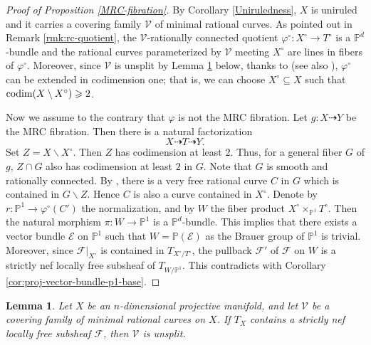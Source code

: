 \documentclass[english,reqno]{amsart}
\newcommand\cV{{\mathcal V}}
\newcommand\bbP{{\mathbb P}}
\newcommand\sE{{\mathscr E}}
\newcommand\sF{{\mathscr F}}
\newcommand{\codim}{{\rm codim}}
\theoremstyle{plain}
\newtheorem{lemma}[thm]{Lemma}
\theoremstyle{definition}
\numberwithin{equation}{section} %
\begin{document}
\begin{proof}[Proof of Proposition \ref{MRC-fibration}]
    By Corollary \ref{Uniruledness}, $X$ is uniruled and it carries a covering family $\cV$ of minimal rational curves. As pointed out in Remark \ref{rmk:rc-quotient}, the $\cV$-rationally connected quotient $\varphi^\circ\colon X^\circ\rightarrow T^\circ$ is a $\mathbb{P}^d$-bundle and the rational curves parameterized by $\cV$ meeting $X^\circ$ are lines in  fibers of $\varphi^\circ$. Moreover, since $\cV$ is unsplit by Lemma \ref{lemma:unsplit} below, thanks to \cite[Theorem 3.4]{Araujo2006} (see also \cite[Theorem 2.1]{Liu2019}), $\varphi^\circ$ can be extended in codimension one; that is, we can choose $X^\circ\subseteq X$ such that $\codim(X\setminus X^\circ)\geqslant 2$.

    Now we assume to the contrary that $\varphi$ is not the MRC fibration.  Let $g:X\dashrightarrow Y$ be the MRC fibration. Then there is a natural factorization $$X\dashrightarrow T \dashrightarrow Y.$$ Set $Z=X\backslash X^\circ$. Then $Z$ has codimension at least $2$. Thus, for a general fiber $G$ of $g$,  $Z\cap G$ also has codimension at least $2$ in $G$. Note that $G$ is smooth and rationally connected. By \cite[II, Proposition 3.7]{Kollar1996}, there is a very free rational curve $C$ in $G$ which is contained in $G\backslash Z$.  Hence $C$ is also a curve contained in $X^\circ$.  Denote by $r\colon \bbP^1\rightarrow \varphi^\circ(C')$ the normalization, and by $W$ the fiber product $X^\circ\times_{\bbP^1} T^\circ$. Then the natural morphism $\pi\colon W\rightarrow \bbP^1$ is a $\mathbb{P}^d$-bundle. This implies that there exists a vector bundle $\sE$ on $\bbP^1$ such that $W=\bbP(\sE)$ as the Brauer group of $\bbP^1$ is trivial. Moreover, since $\sF|_{X^\circ}$ is contained in $T_{X^\circ/T^\circ}$, the pullback $\sF'$ of $\sF$ on $W$ is a strictly nef locally free subsheaf of $T_{W/\bbP^1}$.  This contradicts with Corollary \ref{cor:proj-vector-bundle-p1-base}.
\end{proof}










\begin{lemma}\label{lemma:unsplit}
    Let $X$ be an $n$-dimensional projective manifold, and let $\cV$ be a covering family of minimal rational curves on $X$. If $T_X$ contains a strictly nef locally free subsheaf $\sF$, then $\cV$ is unsplit.
\end{lemma}
\end{document}
